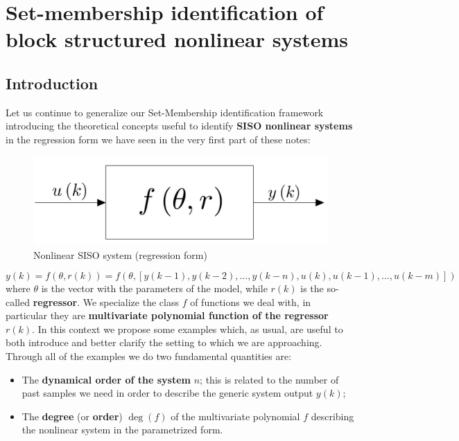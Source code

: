 \chapter[SM-ID of block structured nonlinear systems]{Set-membership identification of block structured nonlinear systems}

\section{Introduction}
Let us continue to generalize our Set-Membership identification framework introducing the theoretical concepts useful to identify \textbf{SISO nonlinear systems} in the regression form we have seen in the very first part of these notes:

\begin{figure}[h]
   \centering
   \includegraphics[scale=0.15]{img/nonlinear.jpeg} 
   \caption{Nonlinear SISO system (regression form)}
\end{figure}
\vspace{-1cm}
\begin{equation}
    y(k)=f(\theta,r(k))=f(\theta, [y(k-1),y(k-2),\dots,y(k-n), u(k), u(k-1), \dots, u(k-m)])
\end{equation}
where $\theta$ is the vector with the parameters of the model, while $r(k)$ is the so-called \textbf{regressor}. We specialize the class $f$ of functions we deal with, in particular they are \textbf{multivariate polynomial function of the regressor $r(k)$}. In this context we propose some examples which, as usual, are useful to both introduce and better clarify the setting to which we are approaching. Through all of the examples we do two fundamental quantities are:
\begin{itemize}
    \item The \textbf{dynamical order of the system} $n$; this is related to the number of past samples we need in order to describe the generic system output $y(k)$; 
    \item The \textbf{degree} (or \textbf{order}) $\deg(f)$ of the multivariate polynomial $f$ describing the nonlinear system in the parametrized form.
\end{itemize}

